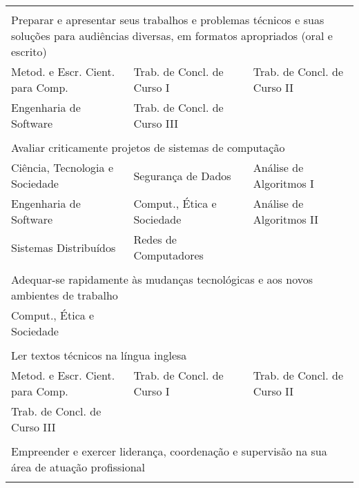 \begin{longtable}{|p{}p{}p{}|}
    \multicolumn{3}{p{0.95\textwidth}}{}\\
    \multicolumn{3}{p{0.95\textwidth}}{Preparar e apresentar seus trabalhos e
    problemas técnicos e suas soluções para audiências diversas, em formatos
    apropriados (oral e escrito)}\\
    \hline
    \textcolor{nblue}{\small Metod. e Escr. Cient. para Comp.} &
    \textcolor{nblue}{Trab. de Concl. de Curso I} &
    \textcolor{nblue}{Trab. de Concl. de Curso II}\\
    \textcolor{nblue}{Engenharia de Software} &
    \textcolor{nblue}{Trab. de Concl. de Curso III} & \\
    \hline
    
    \multicolumn{3}{p{0.95\textwidth}}{}\\
    \multicolumn{3}{p{0.95\textwidth}}{Avaliar criticamente projetos de sistemas de computação}\\
    \hline
    \textcolor{nred}{Ciência, Tecnologia e Sociedade} &
    \textcolor{nblue}{Segurança de Dados} &
    \textcolor{nblue}{Análise de Algoritmos I} \\
    \textcolor{nblue}{Engenharia de Software} &
    \textcolor{nblue}{Comput., Ética e Sociedade} &
    \textcolor{nblue}{Análise de Algoritmos II} \\
    \textcolor{nblue}{Sistemas Distribuídos} & 
    \textcolor{nblue}{Redes de Computadores} & \\
    \hline
    
    \multicolumn{3}{p{0.95\textwidth}}{}\\
    \multicolumn{3}{p{0.95\textwidth}}{Adequar-se rapidamente às mudanças
    tecnológicas e aos novos ambientes de trabalho}\\
    \hline
    \textcolor{nblue}{Comput., Ética e Sociedade} & & \\
    \hline
    
    \multicolumn{3}{p{0.95\textwidth}}{}\\
    \multicolumn{3}{p{0.95\textwidth}}{Ler textos técnicos na língua inglesa}\\
    \hline
    \textcolor{nblue}{\small Metod. e Escr. Cient. para Comp.} &
    \textcolor{nblue}{Trab. de Concl. de Curso I} &
    \textcolor{nblue}{Trab. de Concl. de Curso II} \\
    \textcolor{nblue}{Trab. de Concl. de Curso III} & & \\
    \hline
    
    \multicolumn{3}{p{0.95\textwidth}}{}\\
    \multicolumn{3}{p{0.95\textwidth}}{Empreender e exercer liderança, coordenação
    e supervisão na sua área de atuação profissional}\\
    \hline
    && \\
    \hline
    

\end{longtable}
